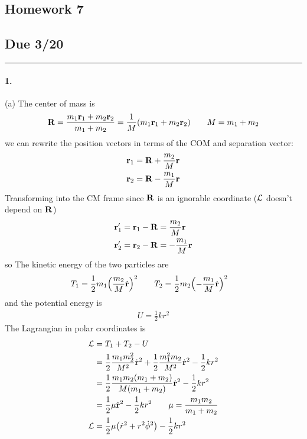 \documentclass[../hw.tex]{subfiles}
\begin{document}
\setcounter{section}{7}
\begin{center}
  \section*{Homework 7} \label{sec:homework7}
  \subsection*{Due 3/20}
\end{center}
\hrule \vspace{10px}

\paragraph*{1.} (a) The center of mass is
\begin{align*}
    \vb R = \frac{m_1 \vb r_1 + m_2 \vb r_2}{m_1 + m_2} = \frac{1}{M} (m_1 \vb r_1 + m_2 \vb r_2) 
    \qquad M = m_1 + m_2
\end{align*}
we can rewrite the position vectors in terms of the COM and separation vector:
\begin{align*}
    \vb r_1 &= \vb R + \frac{m_2}{M} \vb r \\
    \vb r_2 &= \vb R - \frac{m_1}{M} \vb r
\end{align*}
Transforming into the CM frame since $\vb R$ is an ignorable coordinate ($\mathcal{L}$ doesn't depend on $\vb R$)
\begin{align*}
    \vb r_1' &= \vb r_1 - \vb R = \frac{m_2}{M} \vb r \\
    \vb r_2' &= \vb r_2 - \vb R = -\frac{m_1}{M} \vb r
\end{align*}
so The kinetic energy of the two particles are
\begin{align*}
    T_1 &= \frac{1}{2} m_1 \qt(\frac{m_2}{M} \dot{\vb r})^2 
    \qquad T_2 = \frac{1}{2} m_2 \qt(-\frac{m_1}{M} \dot{\vb r})^2 
\end{align*}
and the potential energy is
\begin{align*}
    U = \frac{1}{2} k r^2
\end{align*}
The Lagrangian in polar coordinates is
\begin{align*}
    \lagr &= T_1 + T_2 - U \\
    &= \frac{1}{2} \frac{m_1 m_2^2}{M^2} \dot{\vb r}^2 
        + \frac{1}{2} \frac{m_1^2 m_2}{M^2} \dot{\vb r}^2 - \frac{1}{2} k r^2  \\
    &= \frac{1}{2} \frac{m_1 m_2(m_1 + m_2)}{M(m_1 + m_2)} \dot{\vb r}^2 - \frac{1}{2} k r^2 \\
    &= \frac{1}{2} \mu \dot{\vb r}^2 - \frac{1}{2} k r^2 \qquad \mu = \frac{m_1 m_2}{m_1 + m_2} \\
    \lagr &= \frac{1}{2} \mu \qt(\dot{r}^2 + r^2 \dot{\phi}^2) - \frac{1}{2} k r^2
\end{align*}
\end{document}
